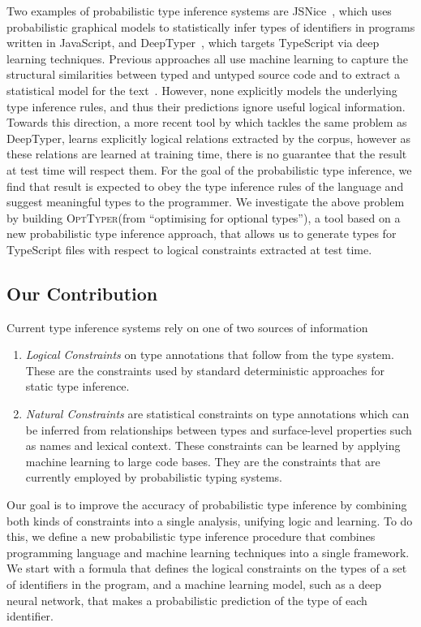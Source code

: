 \documentclass[acmsmall, review, anonymous]{acmart}\settopmatter{printfolios=true,printccs=false,printacmref=false}
\newcommand{\projectname}{\textsc{OptTyper}\xspace}
\begin{document}
Two examples of probabilistic type inference systems are JSNice~\cite{raychev15},
which uses probabilistic graphical models to statistically infer types of identifiers
in programs written in JavaScript,
and DeepTyper~\cite{hellendoorn18}, which targets TypeScript via deep learning techniques.
Previous approaches all use machine learning to capture the structural
similarities between typed and untyped source code and to extract a statistical model for
the text~\cite{allamanis17}. However, none explicitly models the underlying
type inference rules, and thus their predictions ignore useful logical information. Towards this direction, a more recent tool by \citet{wei20} which  tackles the same problem as DeepTyper, learns explicitly logical relations  extracted by the corpus, however as these relations are learned at
training time, there is no guarantee that the result at
test time will respect them. For the goal of the probabilistic type inference, we find that result is expected
to obey the type inference rules of the language and suggest
meaningful  types to 
the programmer.
 We investigate the above problem by building
\projectname (from ``optimising for optional types''),
a tool based on a new probabilistic type inference approach, that allows us to generate types for TypeScript files with respect to logical constraints extracted at test time.

\subsection{Our Contribution}
Current type inference systems rely
on one of two sources of information
\begin{enumerate}[label=(\Roman*)]
	\item \emph{Logical Constraints} on type annotations that follow from the type system.
	      These are the  constraints used by standard deterministic approaches for static type inference.
	\item \emph{Natural Constraints} are statistical constraints on type annotations
	      which can be inferred from relationships between types and surface-level properties such as names and lexical context.
	      These constraints can be learned by applying machine learning to large code bases.
	      They are the constraints that are currently employed by probabilistic typing systems.
\end{enumerate}
Our goal is to improve the accuracy of probabilistic type
inference by combining both kinds of constraints into a single analysis, unifying logic and learning.
To do this, we define a new probabilistic type inference procedure that combines
programming language and machine learning techniques into a single framework.
We start with a formula that defines the logical constraints on the types of a set of identifiers in the program,
and a machine learning model, such as a deep neural network, that makes a probabilistic prediction
of the type of each identifier.
\end{document}

